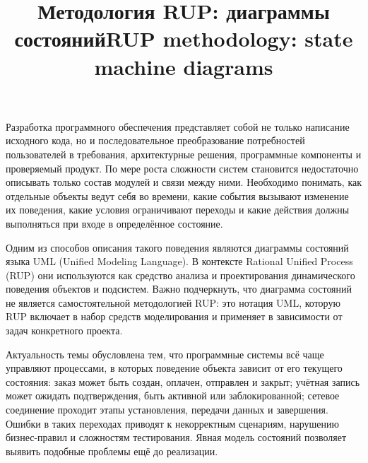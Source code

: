 \documentclass[essay,paper]{pmk-graduate}
\begin{document}
\subject{Методы проектирования и разработки программного обеспечения}


\title{Методология RUP: диаграммы состояний\english RUP methodology: state machine diagrams}

\clearpage

\introduction

Разработка программного обеспечения представляет собой не только написание исходного кода, но и последовательное преобразование потребностей пользователей в требования, архитектурные решения, программные компоненты и проверяемый продукт. По мере роста сложности систем становится недостаточно описывать только состав модулей и связи между ними. Необходимо понимать, как отдельные объекты ведут себя во времени, какие события вызывают изменение их поведения, какие условия ограничивают переходы и какие действия должны выполняться при входе в определённое состояние.

Одним из способов описания такого поведения являются диаграммы состояний языка UML (Unified Modeling Language). В контексте Rational Unified Process (RUP) они используются как средство анализа и проектирования динамического поведения объектов и подсистем. Важно подчеркнуть, что диаграмма состояний не является самостоятельной методологией RUP: это нотация UML, которую RUP включает в набор средств моделирования и применяет в зависимости от задач конкретного проекта.

Актуальность темы обусловлена тем, что программные системы всё чаще управляют процессами, в которых поведение объекта зависит от его текущего состояния: заказ может быть создан, оплачен, отправлен и закрыт; учётная запись может ожидать подтверждения, быть активной или заблокированной; сетевое соединение проходит этапы установления, передачи данных и завершения. Ошибки в таких переходах приводят к некорректным сценариям, нарушению бизнес-правил и сложностям тестирования. Явная модель состояний позволяет выявить подобные проблемы ещё до реализации.
\end{document}
